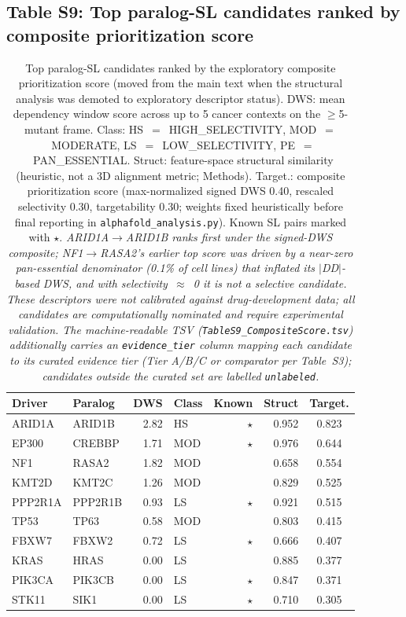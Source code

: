 \documentclass[11pt,a4paper]{article}
\begin{document}
\subsection{Table S9: Top paralog-SL candidates ranked by composite prioritization score}
\begin{table}[H]
\centering
\caption{Top paralog-SL candidates ranked by the exploratory composite prioritization score (moved from the main text when the structural analysis was demoted to exploratory descriptor status). DWS: mean dependency window score across up to 5 cancer contexts on the $\geq$5-mutant frame. Class: HS~$=$~HIGH\_SELECTIVITY, MOD~$=$~MODERATE, LS~$=$~LOW\_SELECTIVITY, PE~$=$~PAN\_ESSENTIAL. Struct: feature-space structural similarity (heuristic, not a 3D alignment metric; Methods). Target.: composite prioritization score (max-normalized signed DWS 0.40, rescaled selectivity 0.30, targetability 0.30; weights fixed heuristically before final reporting in \texttt{alphafold\_analysis.py}). Known SL pairs marked with $\star$. \textit{ARID1A$\rightarrow$ARID1B ranks first under the signed-DWS composite; NF1$\rightarrow$RASA2's earlier top score was driven by a near-zero pan-essential denominator (0.1\% of cell lines) that inflated its $|$DD$|$-based DWS, and with selectivity~$\approx$~0 it is not a selective candidate. These descriptors were not calibrated against drug-development data; all candidates are computationally nominated and require experimental validation. The machine-readable TSV (\texttt{TableS9\_CompositeScore.tsv}) additionally carries an \texttt{evidence\_tier} column mapping each candidate to its curated evidence tier (Tier A/B/C or comparator per Table~S3); candidates outside the curated set are labelled \texttt{unlabeled}.}}
\label{tab:candidates}
\begin{tabular}{llrlrrc}
\toprule
\textbf{Driver} & \textbf{Paralog} & \textbf{DWS} & \textbf{Class} & \textbf{Known} & \textbf{Struct} & \textbf{Target.} \\
\midrule
ARID1A     & ARID1B   & 2.82 & HS & $\star$ & 0.952 & 0.823 \\
EP300      & CREBBP   & 1.71 & MOD & $\star$ & 0.976 & 0.644 \\
NF1        & RASA2    & 1.82 & MOD &  & 0.658 & 0.554 \\
KMT2D      & KMT2C    & 1.26 & MOD &  & 0.829 & 0.525 \\
PPP2R1A    & PPP2R1B  & 0.93 & LS & $\star$ & 0.921 & 0.515 \\
TP53       & TP63     & 0.58 & MOD &  & 0.803 & 0.415 \\
FBXW7      & FBXW2    & 0.72 & LS & $\star$ & 0.666 & 0.407 \\
KRAS       & HRAS     & 0.00 & LS &  & 0.885 & 0.377 \\
PIK3CA     & PIK3CB   & 0.00 & LS & $\star$ & 0.847 & 0.371 \\
STK11      & SIK1     & 0.00 & LS & $\star$ & 0.710 & 0.305 \\
\bottomrule
\end{tabular}
\end{table}
\end{document}
